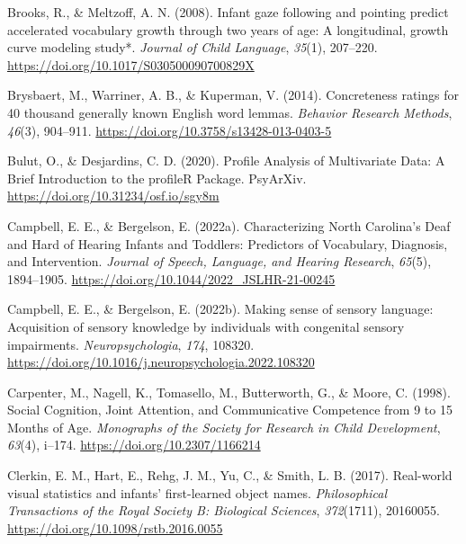 \documentclass[
  man,floatsintext]{apa6}
\newlength{\cslhangindent}
\newlength{\cslentryspacingunit} %
\newenvironment{CSLReferences}[2] %
 {%
  \setlength{\parindent}{0pt}
  \ifodd #1
  \let\oldpar\par
  \def\par{\hangindent=\cslhangindent\oldpar}
  \fi
  \setlength{\parskip}{#2\cslentryspacingunit}
 }%
 {}
\begin{document}
\begin{CSLReferences}{1}{0}
\leavevmode{}%
Brooks, R., \& Meltzoff, A. N. (2008). Infant gaze following and pointing predict accelerated vocabulary growth through two years of age: A longitudinal, growth curve modeling study*. \emph{Journal of Child Language}, \emph{35}(1), 207--220. \url{https://doi.org/10.1017/S030500090700829X}

\leavevmode{}%
Brysbaert, M., Warriner, A. B., \& Kuperman, V. (2014). Concreteness ratings for 40 thousand generally known {English} word lemmas. \emph{Behavior Research Methods}, \emph{46}(3), 904--911. \url{https://doi.org/10.3758/s13428-013-0403-5}

\leavevmode{}%
Bulut, O., \& Desjardins, C. D. (2020). Profile {Analysis} of {Multivariate Data}: {A Brief Introduction} to the {profileR Package}. {PsyArXiv}. \url{https://doi.org/10.31234/osf.io/sgy8m}

\leavevmode{}%
Campbell, E. E., \& Bergelson, E. (2022a). Characterizing {North Carolina}'s {Deaf} and {Hard} of {Hearing Infants} and {Toddlers}: {Predictors} of {Vocabulary}, {Diagnosis}, and {Intervention}. \emph{Journal of Speech, Language, and Hearing Research}, \emph{65}(5), 1894--1905. \url{https://doi.org/10.1044/2022_JSLHR-21-00245}

\leavevmode{}%
Campbell, E. E., \& Bergelson, E. (2022b). Making sense of sensory language: {Acquisition} of sensory knowledge by individuals with congenital sensory impairments. \emph{Neuropsychologia}, \emph{174}, 108320. \url{https://doi.org/10.1016/j.neuropsychologia.2022.108320}

\leavevmode{}%
Carpenter, M., Nagell, K., Tomasello, M., Butterworth, G., \& Moore, C. (1998). Social {Cognition}, {Joint Attention}, and {Communicative Competence} from 9 to 15 {Months} of {Age}. \emph{Monographs of the Society for Research in Child Development}, \emph{63}(4), i--174. \url{https://doi.org/10.2307/1166214}

\leavevmode{}%
Clerkin, E. M., Hart, E., Rehg, J. M., Yu, C., \& Smith, L. B. (2017). Real-world visual statistics and infants' first-learned object names. \emph{Philosophical Transactions of the Royal Society B: Biological Sciences}, \emph{372}(1711), 20160055. \url{https://doi.org/10.1098/rstb.2016.0055}


\end{CSLReferences}
\end{document}
